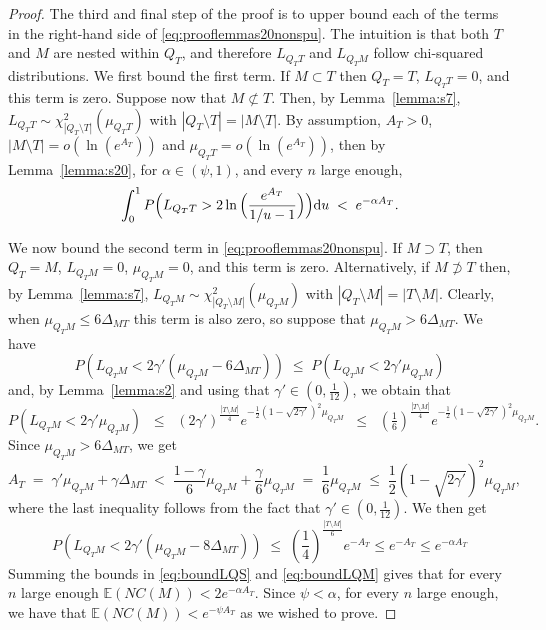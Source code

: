 \documentclass[bj,authoryear]{imsart}
\theoremstyle{plain}
\newcommand{\E}{\mathbb{E}}
\begin{document}
\begin{proof}
The third and final step of the proof is to upper bound each of the terms in the right-hand side of \eqref{eq:prooflemmas20nonspu}. The intuition is that both $T$ and $M$ are nested within $Q_T$, and therefore $L_{Q_T T}$ and $L_{Q_T M}$ follow chi-squared distributions.
We first bound the first term. %
If $M \subset T$ then $Q_T=T$, $L_{Q_TT}=0$, and this term is zero. Suppose now that $M \not\subset T$. %
Then, by Lemma~\ref{lemma:s7}, %
$L_{Q_TT} \sim \mathcal{\chi}_{|Q_T\setminus T|}^2(\mu_{Q_TT})$ with $|Q_T\setminus T|=|M\setminus T|$. By assumption, $A_T>0$, $|M\setminus T|=o(\ln(e^{A_T}))$ and $\mu_{Q_TT}=o(\ln(e^{A_T}))$, then  by Lemma~\ref{lemma:s20}, for $\alpha\in(\psi,1)$, and every $n$ large enough,
\begin{equation}\label{eq:boundLQS}
\int_0^1P\Bigl(L_{Q_TT}>2\ln{\Bigl(\frac{e^{A_T}}{1 / u-1}\Bigl)}\Bigl){\rm d}u \;<\; 
e^{-\alpha A_T}.
\end{equation}

We now bound the second term in \eqref{eq:prooflemmas20nonspu}. If $M \supset T$, then $Q_T=M$, $L_{Q_TM}=0$, $\mu_{Q_TM}=0$, and this term is zero. Alternatively, if $M \not\supset T$ %
then, by Lemma~\ref{lemma:s7}, $L_{Q_TM} \sim \chi_{|Q_T\setminus M|}^2(\mu_{Q_TM})$ with $|Q_T\setminus M|=|T\setminus M|$.
Clearly, when $\mu_{Q_TM}\leq 6\Delta_{MT}$ this term is also zero, so suppose that $\mu_{Q_TM}> 6\Delta_{MT}$.  
We have  
$$P\left(L_{Q_TM}<2\gamma'(\mu_{Q_TM}-6\Delta_{MT})\right)\; \leq \; P\left(L_{Q_TM}<2\gamma'\mu_{Q_TM}\right)$$ 
and, by Lemma~\ref{lemma:s2} and using that $\gamma'\in (0,\tfrac{1}{12})$, we obtain that 
$$P\left(L_{Q_TM}<2\gamma'\mu_{Q_TM}\right) \;\;\leq\;\; (2\gamma')^{\frac{|T\setminus M|}{4}} e^{-\frac{1}{2}(1-\sqrt{2\gamma'})^2\mu_{Q_TM}}\;\;\leq\;\;  (\tfrac16)^{\frac{|T\setminus M|}{4}}e^{-\frac{1}{2}(1-\sqrt{2\gamma'})^2\mu_{Q_TM}}.$$
Since $\mu_{Q_TM}>6\Delta_{MT}$, we get
$$
A_T\;=\;\gamma'\mu_{Q_TM}+\gamma\Delta_{MT}\;<\;\frac{1-\gamma}{6}\mu_{Q_TM}+\frac{\gamma}{6}\mu_{Q_TM}\;=\;\frac16\mu_{Q_TM}\;\leq\;\frac12(1-\sqrt{2\gamma'})^2\mu_{Q_TM},
$$
where the last inequality follows from the fact that $\gamma'\in(0, \tfrac{1}{12})$. We then get
\begin{equation}\label{eq:boundLQM}
    P\left(L_{Q_TM}<2\gamma'(\mu_{Q_TM}-8\Delta_{MT})\right) \;\leq\; \left(\frac14\right)^{\frac{|T\setminus M|}{6}}e^{-A_T} \leq e^{-A_T}\leq e^{-\alpha A_T}
\end{equation}
Summing the bounds in \eqref{eq:boundLQS} and \eqref{eq:boundLQM} gives that for every $n$ large enough $\E\left(NC(M)\right) < 2e^{-\alpha A_T}$. Since $\psi<\alpha$, for every $n$ large enough, we have that $\E\left(NC(M)\right) < e^{-\psi A_T}$ as we wished to prove.
\end{proof}
\end{document}
